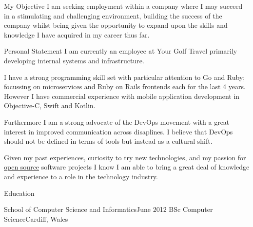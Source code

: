 \documentclass{resume}
\begin{document}

\begin{rSection}{My Objective}
  I am seeking employment within a company where I may succeed in a stimulating
  and challenging environment, building the success of the company whilst being
  given the opportunity to expand upon the skills and knowledge I have acquired
  in my career thus far.
\end{rSection}


\begin{rSection}{Personal Statement}
  I am currently an employee at Your Golf Travel primarily developing internal
  systems and infrastructure.

  I have a strong programming skill set with particular attention to Go and
  Ruby; focussing on microservices and Ruby on Rails frontends each for the
  last 4 years. However I have commercial experience with mobile application
  development in Objective-C, Swift and Kotlin.

  Furthermore I am a strong advocate of the DevOps movement with a great
  interest in improved communication across disaplines. I believe that DevOps
  should not be defined in terms of tools but instead as a cultural shift.

  Given my past experiences, curiosity to try new technologies, and my passion
  for \href{https://github.com/tomasbasham?tab=repositories}{open source}
  software projects I know I am able to bring a great deal of knowledge and
  experience to a role in the technology industry.
\end{rSection}


\begin{rSection}{Education}
  \begin{rSubsection}{School of Computer Science and Informatics}{June 2012}
    {BSc Computer Science}{Cardiff, Wales}
  \end{rSubsection}
\end{rSection}

\end{document}
